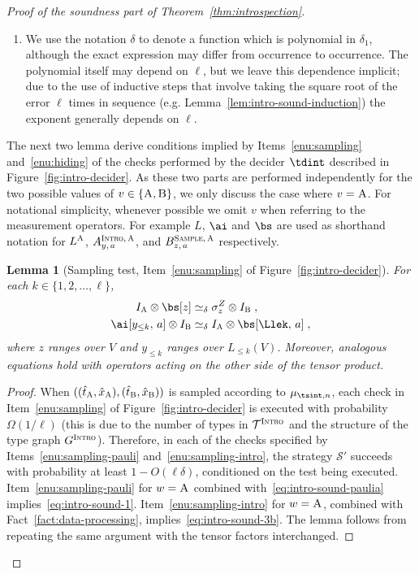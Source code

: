 \documentclass[11pt]{article}
\newtheorem{lemma}[theorem]{Lemma}
\theoremstyle{definition}
\newcommand{\Id}{\ensuremath{I}}
\newcommand{\ia}{\Id_\alice}
\newcommand{\ib}{\Id_\bob}
\newcommand{\strategy}{\mathscr{S}}
\newcommand{\type}{\mathcal{T}}
\newcommand{\gamestyle}[1]{\ensuremath{\textsc{#1}}\xspace}
\newcommand{\intro}{\gamestyle{Intro}}
\newcommand{\labelstyle}[1]{\ensuremath{\textsc{#1}}\xspace}
\newcommand{\trole}{\ensuremath{v}}
\newcommand{\alice}{\labelstyle{A}}
\newcommand{\bob}{\labelstyle{B}}
\newcommand{\typestyle}[1]{\ensuremath{\textsc{#1}}\xspace}
\newcommand{\Sample}{\typestyle{Sample}}
\newcommand{\Intro}{\typestyle{Intro}}
\begin{document}
\begin{proof}[Proof of the soundness part of Theorem~\ref{thm:introspection}]
\begin{enumerate}
  \item We use the notation $\delta$ to denote a function which is polynomial in
    $\delta_1$, although the exact expression may differ from occurrence to
    occurrence.
    The polynomial itself may depend on $\ell$, but we leave this dependence
    implicit; due to the use of inductive steps that involve taking the square
    root of the error $\ell$ times in sequence (e.g.
    Lemma~\ref{lem:intro-sound-induction}) the exponent generally depends on
    $\ell$.
  \end{enumerate}

  The next two lemma derive conditions implied by Items~\ref{enu:sampling}
  and~\ref{enu:hiding} of the checks performed by the decider $\tdint$
  described in Figure~\ref{fig:intro-decider}.
  As these two parts are performed independently for the two possible values of
  $\trole\in\{\alice,\bob\}$, we only discuss the case where $\trole = \alice$.
  For notational simplicity, whenever possible we omit $v$ when referring to the
  measurement operators.
  For example $L$, $\ai$ and $\bs$ are used as shorthand notation
  for $L^\alice$, $A^{\Intro,\, \alice}_{y,\, a}$, and $B^{\Sample,\,
    \alice}_{z,\, a}$ respectively.

  \begin{lemma}[Sampling test, Item~\ref{enu:sampling} of
    Figure~\ref{fig:intro-decider}]
    \label{lem:intro-sound-1}
    For each $k\in\{ 1, 2, \ldots, \ell\}$,
    \begin{align}
      \ia \otimes \bs[z]
      & \simeq_\delta \sigma^Z_z \otimes \ib\;,
        \label{eq:intro-sound-1} \\
      \ai[y_{\leq k},\, a] \otimes \ib
      & \simeq_\delta \ia \otimes \bs[\Llek,\, a]\;,
        \label{eq:intro-sound-3b}
    \end{align}
    where $z$ ranges over $V$ and $y_{\leq k}$ ranges over $L_{\leq k}(V)$.
    Moreover, analogous equations hold with operators acting on the other side
    of the tensor product.
  \end{lemma}
	
  \begin{proof}
    When $((\hat{t}_\alice,\hat{x}_\alice),(\hat{t}_\bob,\hat{x}_\bob))$ is
    sampled according to $\mu_{\tsint,n}$, each check in
    Item~\ref{enu:sampling} of Figure~\ref{fig:intro-decider} is executed with
    probability $\Omega(1/\ell)$ (this is due to the number of types in
    $\type^\intro$ and the structure of the type graph $G^\intro$).
    Therefore, in each of the checks specified by Items~\ref{enu:sampling-pauli}
    and~\ref{enu:sampling-intro}, the strategy $\strategy'$ succeeds with
    probability at least $1 - O(\ell \delta)$, conditioned on the test being
    executed.
    Item~\ref{enu:sampling-pauli} for $w=\alice$ combined
    with~\eqref{eq:intro-sound-paulia} implies~\eqref{eq:intro-sound-1}.
    Item~\ref{enu:sampling-intro} for $w=\alice$, combined with
    Fact~\ref{fact:data-processing}, implies~\eqref{eq:intro-sound-3b}.
    The lemma follows from repeating the same argument with the tensor factors
    interchanged.
  \end{proof}


\end{proof}
\end{document}
